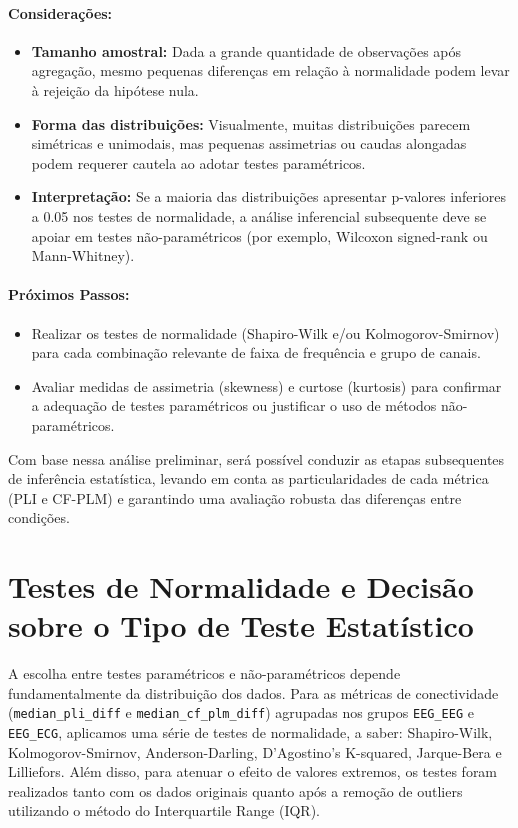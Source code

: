 \paragraph{Considerações:}
\begin{itemize}
    \item \textbf{Tamanho amostral:} Dada a grande quantidade de observações após agregação, mesmo pequenas diferenças em relação à normalidade podem levar à rejeição da hipótese nula.
    \item \textbf{Forma das distribuições:} Visualmente, muitas distribuições parecem simétricas e unimodais, mas pequenas assimetrias ou caudas alongadas podem requerer cautela ao adotar testes paramétricos.
    \item \textbf{Interpretação:} Se a maioria das distribuições apresentar p-valores inferiores a 0.05 nos testes de normalidade, a análise inferencial subsequente deve se apoiar em testes não-paramétricos (por exemplo, Wilcoxon signed-rank ou Mann-Whitney).
\end{itemize}

\paragraph{Próximos Passos:}
\begin{itemize}
    \item Realizar os testes de normalidade (Shapiro-Wilk e/ou Kolmogorov-Smirnov) para cada combinação relevante de faixa de frequência e grupo de canais.
    \item Avaliar medidas de assimetria (skewness) e curtose (kurtosis) para confirmar a adequação de testes paramétricos ou justificar o uso de métodos não-paramétricos.
\end{itemize}

Com base nessa análise preliminar, será possível conduzir as etapas subsequentes de inferência estatística, levando em conta as particularidades de cada métrica (PLI e CF-PLM) e garantindo uma avaliação robusta das diferenças entre condições.

\section{Testes de Normalidade e Decisão sobre o Tipo de Teste Estatístico}
A escolha entre testes paramétricos e não-paramétricos depende fundamentalmente da distribuição dos dados. Para as métricas de conectividade (\texttt{median\_pli\_diff} e \texttt{median\_cf\_plm\_diff}) agrupadas nos grupos \texttt{EEG\_EEG} e \texttt{EEG\_ECG}, aplicamos uma série de testes de normalidade, a saber: Shapiro-Wilk, Kolmogorov-Smirnov, Anderson-Darling, D'Agostino's K-squared, Jarque-Bera e Lilliefors. Além disso, para atenuar o efeito de valores extremos, os testes foram realizados tanto com os dados originais quanto após a remoção de outliers utilizando o método do Interquartile Range (IQR).

